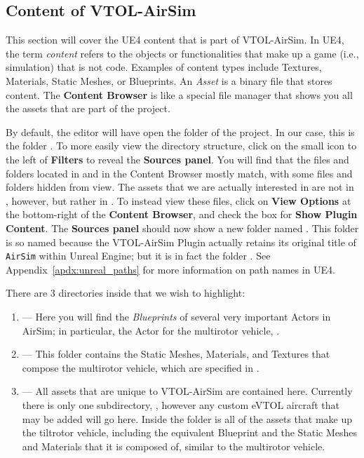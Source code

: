 \subsection{Content of VTOL-AirSim}\label{sec:content_vtolairsim}
This section will cover the UE4 content that is part of VTOL-AirSim. In UE4, the term \textit{content} refers to the objects or functionalities that make up a game (i.e., simulation) that is not \CC code. Examples of content types include Textures, Materials, Static Meshes, or Blueprints. An \textit{Asset} is a binary file that stores content. The \textbf{Content Browser} is like a special file manager that shows you all the assets that are part of the project.

By default, the editor will have open the  folder of the project. In our case, this is the folder . To more easily view the directory structure, click on the small icon to the left of \textbf{Filters} to reveal the \textbf{Sources panel}. You will find that the files and folders located in  and in the Content Browser mostly match, with some files and folders hidden from view. The assets that we are actually interested in are not in , however, but rather in . To instead view these files, click on \textbf{View Options} at the bottom-right of the \textbf{Content Browser}, and check the box for \textbf{Show Plugin Content}. The \textbf{Sources panel} should now show a new folder named . This folder is so named because the VTOL-AirSim Plugin actually retains its original title of \texttt{AirSim} within Unreal Engine; but it is in fact the folder . See Appendix~\ref{apdx:unreal_paths} for more information on path names in UE4.

There are 3 directories inside  that we wish to highlight:
\begin{enumerate}
    \item {} --- Here you will find the \textit{Blueprints} of several very important Actors in AirSim; in particular, the Actor for the multirotor vehicle, .
    \item {} --- This folder contains the Static Meshes, Materials, and Textures that compose the multirotor vehicle, which are specified in .
    \item {} --- All assets that are unique to VTOL-AirSim are contained here. Currently there is only one subdirectory, , however any custom eVTOL aircraft that may be added will go here. Inside the  folder is all of the assets that make up the tiltrotor vehicle, including the equivalent  Blueprint and the Static Meshes and Materials that it is composed of, similar to the multirotor vehicle.
\end{enumerate}

